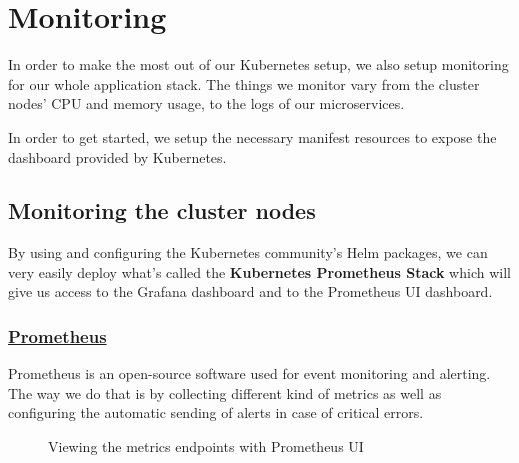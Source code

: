 \section{Monitoring}
In order to make the most out of our Kubernetes setup, we also setup monitoring for our whole application stack.
The things we monitor vary from the cluster nodes' CPU and memory usage, to the logs of our microservices.

In order to get started, we setup the necessary manifest resources to expose the dashboard provided by Kubernetes.

\subsection{Monitoring the cluster nodes}
By using and configuring the Kubernetes community's Helm packages, we can very easily deploy what's called the \textbf{Kubernetes Prometheus Stack} which will give us access to the Grafana dashboard and to the Prometheus UI dashboard.

\subsubsection*{\underline{Prometheus}}
Prometheus is an open-source software used for event monitoring and alerting.
The way we do that is by collecting different kind of metrics as well as configuring the automatic sending of alerts in case of critical errors.
\begin{figure}[H]
    \centering
    \caption{Viewing the metrics endpoints with Prometheus UI}
    \label{fig:prometheus-ui-metrics-endpoint}
\end{figure}

